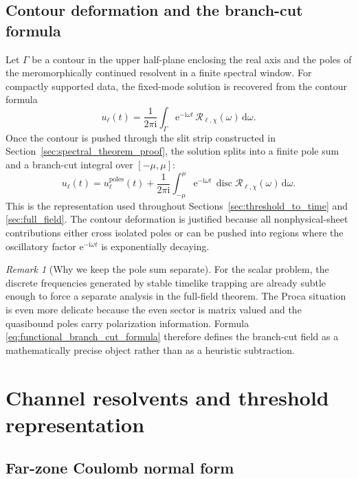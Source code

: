 \documentclass[12pt]{article}
\numberwithin{equation}{section}
\theoremstyle{plain}
\theoremstyle{definition}
\theoremstyle{remark}
\newtheorem{remark}{Remark}[section]
\newcommand{\ii}{\mathrm i}
\newcommand{\ee}{\mathrm e}
\newcommand{\dd}{\mathrm d}
\newcommand{\disc}{\operatorname{disc}}
\newcommand{\cR}{\mathcal R}
\newcommand{\om}{\omega}
\begin{document}
\subsection{Contour deformation and the branch-cut formula}

Let $\Gamma$ be a contour in the upper half-plane enclosing the real axis and the poles of the meromorphically continued resolvent in a finite spectral window.  For compactly supported data, the fixed-mode solution is recovered from the contour formula
\[
   u_{\ell}(t)=\frac{1}{2\pi\ii}\int_{\Gamma}\ee^{-\ii\om t}\,\cR_{\ell,\chi}(\om)\,\dd\om.
\]
Once the contour is pushed through the slit strip constructed in Section~\ref{sec:spectral_theorem_proof}, the solution splits into a finite pole sum and a branch-cut integral over $[-\mu,\mu]$:
\begin{equation}\label{eq:functional_branch_cut_formula}
   u_{\ell}(t)=u_{\ell}^{\mathrm{poles}}(t)
   +\frac{1}{2\pi\ii}\int_{-\mu}^{\mu}\ee^{-\ii\om t}\,
      \disc \cR_{\ell,\chi}(\om)\,\dd\om.
\end{equation}
This is the representation used throughout Sections~\ref{sec:threshold_to_time} and \ref{sec:full_field}.  The contour deformation is justified because all nonphysical-sheet contributions either cross isolated poles or can be pushed into regions where the oscillatory factor $\ee^{-\ii\om t}$ is exponentially decaying.

\begin{remark}[Why we keep the pole sum separate]
For the scalar problem, the discrete frequencies generated by stable timelike trapping are already subtle enough to force a separate analysis in the full-field theorem.  The Proca situation is even more delicate because the even sector is matrix valued and the quasibound poles carry polarization information.  Formula \eqref{eq:functional_branch_cut_formula} therefore defines the branch-cut field as a mathematically precise object rather than as a heuristic subtraction.
\end{remark}


\section{Channel resolvents and threshold representation}\label{sec:resolvent}

\subsection{Far-zone Coulomb normal form}
\end{document}
